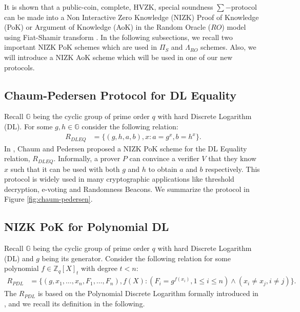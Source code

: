 It is shown that a public-coin, complete, HVZK, special soundness $\sum-$protocol can be made into a
Non Interactive Zero Knowledge (NIZK) Proof of Knowledge (PoK) or Argument of Knowledge (AoK) in the 
Random Oracle ($RO$) model using Fiat-Shamir transform \cite{10.1007/3-540-47721-7_12}. 
In the following subsections, we recall two important NIZK PoK schemes which are used in $\Pi_S$ and 
$\Lambda_{RO}$ schemes. Also, we will introduce a NIZK AoK scheme which will be used in one of 
our new protocols.

\subsection{Chaum-Pedersen Protocol for DL Equality}
\label{subsec:chaum-pedersen}
Recall $\mathbb{G}$ being the cyclic group of prime order $q$ with hard Discrete Logarithm (DL). 
For some $g,h\in \mathbb{G}$ consider the following relation:
\begin{align*}
  R_{DLEQ} &= \{(g,h,a,b),x : a=g^x, b=h^x\}.
\end{align*}
In \cite{10.1007/3-540-48071-4_7}, Chaum and Pedersen proposed a NIZK PoK scheme for the DL Equality 
relation, $R_{DLEQ}$. Informally, a prover $P$ can convince a verifier $V$ that they know $x$ such that
it can be used with both $g$ and $h$ to obtain $a$ and $b$ respectively. This protocol is widely used in
many cryptographic applications like threshold decryption, e-voting and Randomness Beacons. 
We summarize the protocol in Figure \ref{fig:chaum-pedersen}.


\subsection{NIZK PoK for Polynomial DL}
\label{subsec:polynomial-dl}
Recall $\mathbb{G}$ being the cyclic group of prime order $q$ with hard Discrete Logarithm (DL) and $g$ 
being its generator. Consider the following relation for some polynomial $f\in\mathbb{Z}_q[X]_t$ with
degree $t<n$:
\begin{align*}
  R_{PDL} &= \{(g,x_1,\dots,x_n,F_1,\dots,F_n),f(X) : (F_i=g^{f(x_i)}, 1\leq i\leq n)\wedge(x_i\neq x_j, i\neq j)\}.
\end{align*}
The $R_{PDL}$ is based on the Polynomial Discrete Logarithm formally introduced in \cite{cryptoeprint:2023/1669}, 
and we recall its definition in the following.

